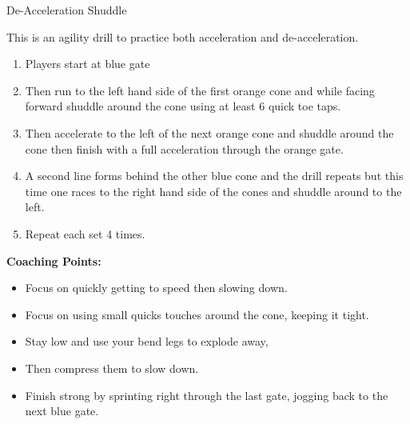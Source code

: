 \begin{oddBlock}{De-Acceleration Shuddle}
\begin{minipage}[t]{\linewidth}
\begin{minipage}{.6\linewidth}
        This is an agility drill to practice both acceleration and de-acceleration.
        \begin{enumerate}
        \setlength{\itemsep}{0pt}
        \setlength{\parskip}{0pt}
        \setlength{\parsep}{0pt}
        \item Players start at blue gate
        \item Then run to the left hand side of the first orange cone and while facing forward shuddle around the cone using at least 6 quick toe taps.
        \item Then accelerate to the left of the next orange cone and shuddle around the cone then finish with a full acceleration through the orange gate.
        \item A second line forms behind the other blue cone and the drill repeats but this time one races to the right hand side of the cones and shuddle around to the left.
        \item Repeat each set 4 times.
        \end{enumerate}
    \end{minipage}
\end{minipage}
    \vspace{12pt}
    
    \textbf{Coaching Points:}
    \begin{itemize}
        \setlength{\itemsep}{0pt}
        \setlength{\parskip}{0pt}
        \setlength{\parsep}{0pt}
        \item Focus on quickly getting to speed then slowing down.
        \item Focus on using small quicks touches around the cone, keeping it tight.
        \item Stay low and use your bend legs to explode away,
        \item Then compress them to slow down.
        \item Finish strong by sprinting right through the last gate, jogging back to the next blue gate.
    \end{itemize}
\end{oddBlock}